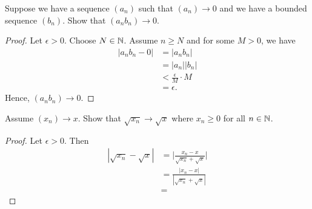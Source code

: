 \documentclass{article}
\begin{document}
Suppose we have a sequence \( (a_n) \) such that \( (a_n) \to 0 \) and we have a bounded sequence \( (b_n)\). Show that \( (a_n b_n ) \to 0 \). 
\begin{tcolorbox}
    \begin{proof}
    Let \( \epsilon > 0 \). Choose \( N \in \mathbb{N} \). Assume \( n \geq N \) and for some \( M > 0 \), we have 
    \begin{align*}
        |a_nb_n - 0 |&= | a_n b_n |  \\
                     &= |a_n| |b_n| \\
                     &< \frac{\epsilon}{M}\cdot M  \tag{\((b_n)\) is bounded }\\
                     &= \epsilon.
    \end{align*}
    Hence, \( (a_nb_n) \to 0 \). 
    \end{proof}
\end{tcolorbox}

Assume \( (x_n) \to x \). Show that \( \sqrt{x_n} \to \sqrt{x}\) where \( x_n \geq 0 \) for all \( n \in \mathbb{N} \). 
\begin{tcolorbox}
    \begin{proof}
    Let \( \epsilon > 0 \). Then 
    \begin{align*}
        |\sqrt{x_n} - \sqrt{x}|&= \Big| \frac{x_n - x}{\sqrt{x_n} + \sqrt{x}}\Big| \\
                               &= \frac{ |x_n - x|}{|\sqrt{x_n} + \sqrt{x}|} \\
                               &= 
    \end{align*}
    \end{proof}
\end{tcolorbox}
\end{document}
